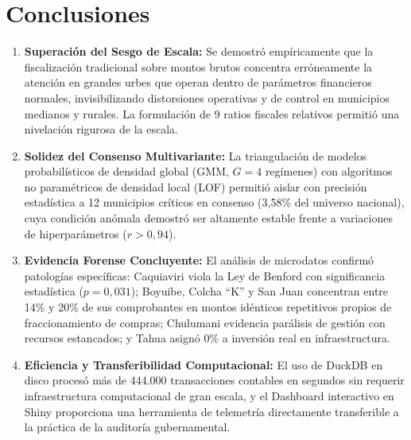 \documentclass[11pt,a4paper]{article}
\begin{document}
\section{Conclusiones}
\begin{enumerate}[label=\textbf{\arabic*.}]
    \item \textbf{Superación del Sesgo de Escala:} Se demostró empíricamente que la fiscalización tradicional sobre montos brutos concentra erróneamente la atención en grandes urbes que operan dentro de parámetros financieros normales, invisibilizando distorsiones operativas y de control en municipios medianos y rurales. La formulación de 9 ratios fiscales relativos permitió una nivelación rigurosa de la escala.
    \item \textbf{Solidez del Consenso Multivariante:} La triangulación de modelos probabilísticos de densidad global (GMM, $G=4$ regímenes) con algoritmos no paramétricos de densidad local (LOF) permitió aislar con precisión estadística a 12 municipios críticos en consenso (3,58\% del universo nacional), cuya condición anómala demostró ser altamente estable frente a variaciones de hiperparámetros ($r > 0,94$).
    \item \textbf{Evidencia Forense Concluyente:} El análisis de microdatos confirmó patologías específicas: Caquiaviri viola la Ley de Benford con significancia estadística ($p=0,031$); Boyuibe, Colcha ``K'' y San Juan concentran entre 14\% y 20\% de sus comprobantes en montos idénticos repetitivos propios de fraccionamiento de compras; Chulumani evidencia parálisis de gestión con recursos estancados; y Tahua asignó 0\% a inversión real en infraestructura.
    \item \textbf{Eficiencia y Transferibilidad Computacional:} El uso de DuckDB en disco procesó más de 444.000 transacciones contables en segundos sin requerir infraestructura computacional de gran escala, y el Dashboard interactivo en Shiny proporciona una herramienta de telemetría directamente transferible a la práctica de la auditoría gubernamental.
\end{enumerate}

\end{document}
